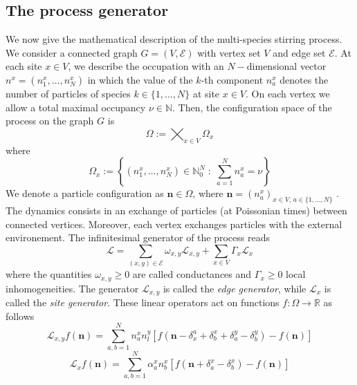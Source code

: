 \documentclass[11pt]{article}
\numberwithin{equation}{section}
\numberwithin{equation}{subsection}
\newcommand{\twoj}{\nu}
\begin{document}
\subsection{The process generator}
We now give the mathematical description of the multi-species stirring process.
We consider a connected graph $G=(V,\mathcal{E})$ with vertex set $V$ and edge set $\mathcal{E}$.
At each site $x\in V$, we describe the occupation with an $N-$dimensional vector $n^{x}=(n_{1}^{x},\ldots,n_{N}^{x})$ in which the value of the $k$-th component $n_{a}^{x}$ denotes the number of particles of species $k\in \{1,\ldots,N\}$ at site $x\in V$. On each vertex we allow a total  maximal occupancy $\nu\in \mathbb{N}$. Then, the configuration space of the process on the graph $G$ is 
\begin{equation}\label{stateSpace}
    \Omega:=\bigtimes_{x\in V} \Omega_{x}
\end{equation}
where
\begin{equation}
\Omega_{x}:=\left\{(n_{1}^{x},\ldots,n_{N}^{x})\in\mathbb{N}_0^{N}\;:\; \sum_{a=1}^{N}n_{a}^{x}=\twoj\right\}
\end{equation}
We denote a particle configuration as $\mathbf{n}\in \Omega$, where $\mathbf{n}=(n_{a}^{x})_{x\in V,\,a\in\{1,\ldots,N\}}$ .\\
The dynamics consists in an exchange of particles (at Poissonian times) between connected vertices. Moreover, each vertex  exchanges particles with the external environement. The infinitesimal generator of the process reads
\begin{equation}\label{Generator}
    \mathcal{L}=\sum_{(x,y)\in \mathcal{E}}\omega_{x,y}\mathcal{L}_{x,y}+\sum_{x\in V}\Gamma_{x}\mathcal{L}_{x}
\end{equation}
where the quantities $ \omega_{x,y}\geq 0$ are called conductances and $\Gamma_{x}\geq 0$ local inhomogeneities. The generator $\mathcal{L}_{x,y}$ is called the \textit{edge generator}, while $\mathcal{L}_{x}$ is called the \textit{site generator}. These linear operators act on functions $f:\Omega\to \mathbb{R}$ as follows
\begin{equation}\label{edgeGenerator}
\mathcal{L}_{x,y}f(\bm{n})=\sum_{a,b=1}^{N}n_{a}^{x}n_{l}^{y}\left[f(\bm{n}-\delta_{x}^{a}+\delta_{b}^{x}+\delta_{a}^{y}-\delta_{b}^{y})-f(\bm{n})\right]
\end{equation}
\begin{equation}\label{siteGenerator}
    \mathcal{L}_{x}f(\bm{n})=\sum_{a,b=1}^{N}\alpha_{a}^{x}n_{b}^{x}\left[f(\bm{n}+\delta_{a}^{x}-\delta_{b}^{x})-f(\bm{n})\right]
\end{equation}
\end{document}
